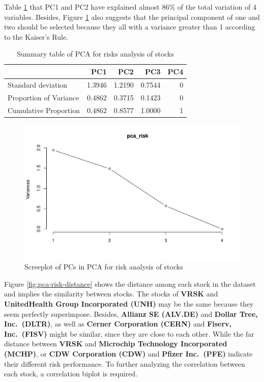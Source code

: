 \documentclass[11pt,a4paper,]{article}
\begin{document}
Table \ref{tab:pca-risk-summary} that PC1 and PC2 have explained almost 86\% of the total variation of 4 variables. Besides, Figure \ref{fig:pca-risk-screeplot} also suggests that the principal component of one and two should be selected because they all with a variance greater than 1 according to the Kaiser's Rule.

\begin{table}

\caption{\label{tab:pca-risk-summary}Summary table of PCA for risks analysis of stocks}
\centering
\begin{tabular}[t]{l|r|r|r|r}
\hline
  & PC1 & PC2 & PC3 & PC4\\
\hline
Standard deviation & 1.3946 & 1.2190 & 0.7544 & 0\\
\hline
Proportion of Variance & 0.4862 & 0.3715 & 0.1423 & 0\\
\hline
Cumulative Proportion & 0.4862 & 0.8577 & 1.0000 & 1\\
\hline
\end{tabular}
\end{table}

\begin{figure}
\centering
\includegraphics{ass2_files/figure-latex/pca-risk-screeplot-1.pdf}
\caption{\label{fig:pca-risk-screeplot}Screeplot of PCs in PCA for risk analysis of stocks}
\end{figure}

Figure \ref{fig:pca-risk-distance} shows the distance among each stock in the dataset and implies the similarity between stocks. The stocks of \textbf{VRSK} and \textbf{UnitedHealth Group Incorporated (UNH)} may be the same because they seem perfectly superimpose. Besides, \textbf{Allianz SE (ALV.DE)} and \textbf{Dollar Tree, Inc.~(DLTR)}, as well as \textbf{Cerner Corporation (CERN)} and \textbf{Fiserv, Inc.~(FISV)} might be similar, since they are close to each other. While the far distance between \textbf{VRSK} and \textbf{Microchip Technology Incorporated (MCHP)}, or \textbf{CDW Corporation (CDW)} and \textbf{Pfizer Inc.~(PFE)} indicate their different risk performance. To further analyzing the correlation between each stock, a correlation biplot is required.
\end{document}
